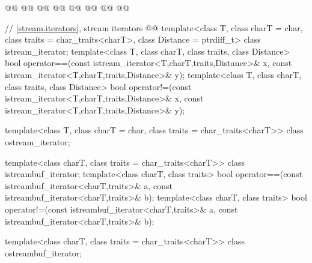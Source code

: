 \begin{addedblock}
\begin{codeblock}
  @@
    @@
  @@
    @@
  @@
    @@
  @@
    @@
\end{codeblock}\end{addedblock}\begin{codeblock}

  // \ref{stream.iterators}, stream iterators
  @@
  template<class T, class charT = char, class traits = char_traits<charT>,
           class Distance = ptrdiff_t>
  class istream_iterator;
  template<class T, class charT, class traits, class Distance>
    bool operator==(const istream_iterator<T,charT,traits,Distance>& x,
            const istream_iterator<T,charT,traits,Distance>& y);
  template<class T, class charT, class traits, class Distance>
    bool operator!=(const istream_iterator<T,charT,traits,Distance>& x,
            const istream_iterator<T,charT,traits,Distance>& y);

  template<class T, class charT = char, class traits = char_traits<charT>>
      class ostream_iterator;

  template<class charT, class traits = char_traits<charT>>
    class istreambuf_iterator;
  template<class charT, class traits>
    bool operator==(const istreambuf_iterator<charT,traits>& a,
            const istreambuf_iterator<charT,traits>& b);
  template<class charT, class traits>
    bool operator!=(const istreambuf_iterator<charT,traits>& a,
            const istreambuf_iterator<charT,traits>& b);

  template<class charT, class traits = char_traits<charT>>
    class ostreambuf_iterator;


\end{codeblock}
